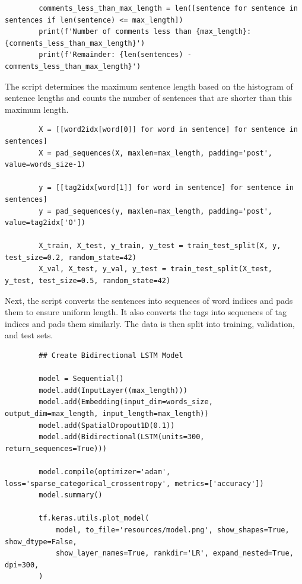 \documentclass{solutionclass} %
\begin{document}
\begin{solution}
\begin{lstlisting}
        comments_less_than_max_length = len([sentence for sentence in sentences if len(sentence) <= max_length])
        print(f'Number of comments less than {max_length}: {comments_less_than_max_length}')
        print(f'Remainder: {len(sentences) - comments_less_than_max_length}')
        \end{lstlisting}
        
        The script determines the maximum sentence length based on the histogram of sentence lengths and counts the number of sentences that are shorter than this maximum length.
        
        \begin{lstlisting}
        X = [[word2idx[word[0]] for word in sentence] for sentence in sentences]
        X = pad_sequences(X, maxlen=max_length, padding='post', value=words_size-1)
        
        y = [[tag2idx[word[1]] for word in sentence] for sentence in sentences]
        y = pad_sequences(y, maxlen=max_length, padding='post', value=tag2idx['O'])
        
        X_train, X_test, y_train, y_test = train_test_split(X, y, test_size=0.2, random_state=42)
        X_val, X_test, y_val, y_test = train_test_split(X_test, y_test, test_size=0.5, random_state=42)
        \end{lstlisting}
        
        Next, the script converts the sentences into sequences of word indices and pads them to ensure uniform length. It also converts the tags into sequences of tag indices and pads them similarly. The data is then split into training, validation, and test sets.
        
        \begin{lstlisting}
        ## Create Bidirectional LSTM Model
        
        model = Sequential()
        model.add(InputLayer((max_length)))
        model.add(Embedding(input_dim=words_size, output_dim=max_length, input_length=max_length))
        model.add(SpatialDropout1D(0.1))
        model.add(Bidirectional(LSTM(units=300, return_sequences=True)))
        
        model.compile(optimizer='adam', loss='sparse_categorical_crossentropy', metrics=['accuracy'])
        model.summary()
        
        tf.keras.utils.plot_model(
            model, to_file='resources/model.png', show_shapes=True, show_dtype=False,
            show_layer_names=True, rankdir='LR', expand_nested=True, dpi=300,
        )
        \end{lstlisting}
        

\end{solution}
\end{document}
